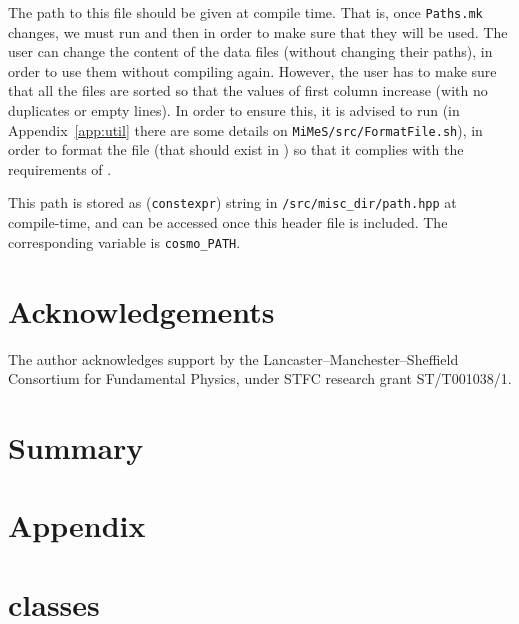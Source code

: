\documentclass[11pt,a4paper]{article}
\renewcommand{\theequation}{\arabic{section}.\arabic{equation}}
\begin{document}
The path to this file should be given at compile time. That is, once {\tt Paths.mk} changes, we must run  and then  in order to make sure that they will be used. The user can change the content of the data files (without changing their paths), in order to use them without compiling \nsc again. However, the user has to make sure that all the files are sorted so that the values of first column increase (with no duplicates or empty lines). In order to ensure this, it is advised to run  (in Appendix~\ref{app:util} there are some details on {\tt MiMeS/src/FormatFile.sh}), in order to format the file (that should exist in ) so that it complies with the requirements of \nsc.

This path is stored as ({\tt constexpr}) string in {\tt \nsc/src/misc\_dir/path.hpp} at compile-time, and can be accessed once this header file is included. The corresponding variable is {\tt cosmo\_PATH}.








\section{Acknowledgements}
%
The author acknowledges support by the Lancaster–Manchester–Sheffield Consortium for Fundamental Physics, under STFC research grant ST/T001038/1.


\section{Summary}


\setcounter{section}{0}
\section*{Appendix}
\appendix

\renewcommand{\theequation}{\Alph{section}.\arabic{equation}}
\setcounter{equation}{0}  %







\section{\CPP classes}\label{app:classes}
\setcounter{equation}{0}
\end{document}
